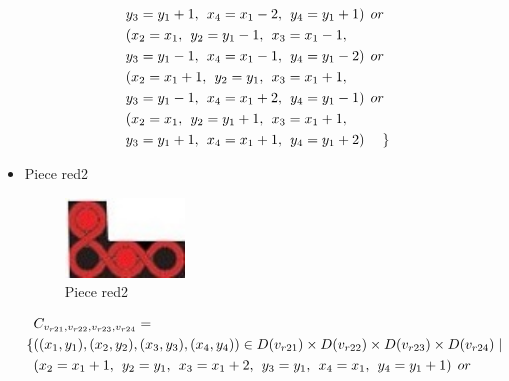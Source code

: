 \begin{appendices}
\begin{itemize}
\begin{align*}
\\&y_{3} = y_{1}+1,\hspace{1ex}x_{4} = x_{1}-2,\hspace{1ex}y_{4} = y_{1}+1)\hspace{1ex} or\\
&(x_{2} = x_{1},\hspace{1ex}y_{2} = y_{1}-1,\hspace{1ex}x_{3} = x_{1}-1, 
\\&y_{3} = y_{1}-1,\hspace{1ex}x_{4} = x_{1}-1,\hspace{1ex}y_{4} = y_{1}-2)\hspace{1ex} or\\
&(x_{2} = x_{1}+1,\hspace{1ex}y_{2} = y_{1},\hspace{1ex}x_{3} = x_{1}+1, 
\\&y_{3} = y_{1}-1,\hspace{1ex}x_{4} = x_{1}+2,\hspace{1ex}y_{4} = y_{1}-1)\hspace{1ex} or\\
&(x_{2} = x_{1},\hspace{1ex}y_{2} = y_{1}+1,\hspace{1ex}x_{3} = x_{1}+1, 
\\&y_{3} = y_{1}+1,\hspace{1ex}x_{4} = x_{1}+1,\hspace{1ex}y_{4} = y_{1}+2)\hspace{3ex} \} 
\end{align*}
\item Piece red2\\
\begin{figure}[H]
    \centering
    \includegraphics[width=0.3\textwidth]{figs/red2.jpg}
    \caption{Piece red2}
\end{figure}
\begin{align*}
&\Const{r21}{r22}{r23}{r24}=
\\\{&((x_{1},y_{1}),(x_{2},y_{2}),(x_{3},y_{3}),(x_{4},y_{4}))\in \Domain{r21}\times \Domain{r22}\times\Domain{r23}\times\Domain{r24}\mid\\
&(x_{2} = x_{1} + 1,\hspace{1ex}y_{2} = y_{1},\hspace{1ex}x_{3} = x_{1} + 2, \hspace{1ex}y_{3} = y_{1},\hspace{1ex}x_{4} = x_{1},\hspace{1ex}y_{4} = y_{1}+1)\hspace{1ex} or\\

\end{align*}
\end{itemize}
\end{appendices}
